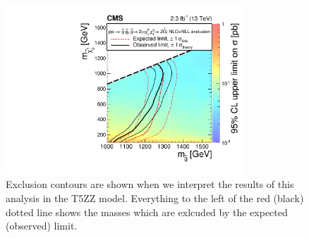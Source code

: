 \begin{figure}[!htb]
\begin{center}
\includegraphics[width=0.8\textwidth]{results/figs/T5ZZ_Exclusion_13TeV.pdf}
\caption{ Exclusion contours are shown when we interpret the results of this analysis in the T5ZZ model.
  Everything to the left of the red (black) dotted line shows the masses which are exlcuded by the expected (observed) limit.
\label{fig:results_T5ZZ}}
\end{center}
\end{figure}


\clearpage
